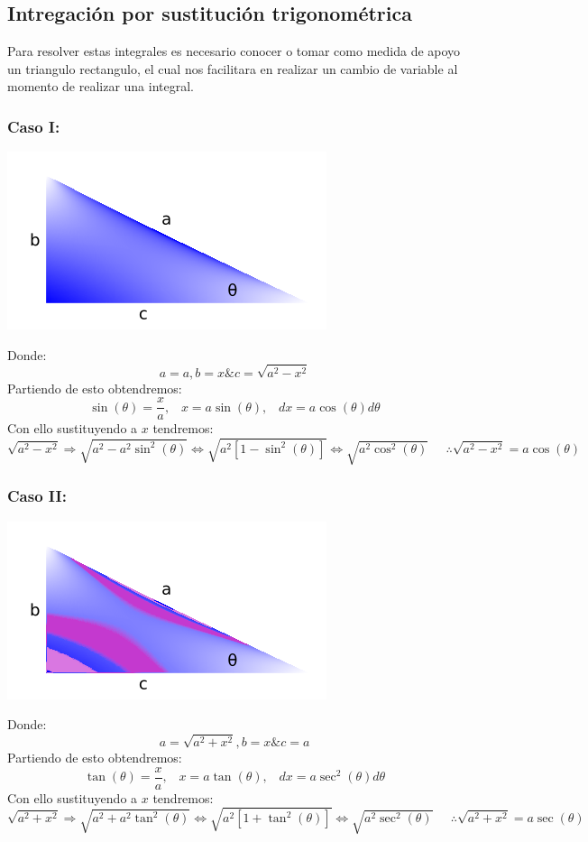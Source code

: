 \documentclass[10pt,executivepaper]{article}
\begin{document}
\subsection{Intregación por sustitución trigonométrica}
Para resolver estas integrales es necesario conocer o tomar como medida de apoyo un triangulo rectangulo, el cual nos facilitara en realizar un cambio de variable al momento de realizar una integral.\\
\subsubsection{Caso I:}
\begin{center}
  \includegraphics[scale=0.5]{imgsAux/triangulo.png}\\
\end{center}
Donde:
\[a=a, b=x \& c=\sqrt{a^{2}-x^{2}}\]
Partiendo de esto obtendremos:
\[\sin(\theta)= \frac{x}{a},\;\;\; x=a\sin(\theta),\;\;\; dx=a\cos(\theta)d\theta\]
Con ello sustituyendo a $x$ tendremos:
\[\sqrt{a^{2}-x^{2}}\Rightarrow \sqrt{a^{2}-a^{2}\sin^{2}(\theta)} \Leftrightarrow \sqrt{a^{2}[1-\sin^{2}(\theta)]} \Leftrightarrow \sqrt{a^{2}\cos^{2}(\theta)}\;\;\;\;\; \therefore \sqrt{a^{2}-x^{2}}=a\cos(\theta)\]
\subsubsection{Caso II:}
\begin{center}
  \includegraphics[scale=0.5]{imgsAux/triangulo1.png}\\
\end{center}
Donde:
\[a=\sqrt{a^{2}+x^{2}}, b=x \& c=a\]
Partiendo de esto obtendremos:
\[\tan(\theta)= \frac{x}{a},\;\;\; x=a\tan(\theta),\;\;\; dx=a\sec^{2}(\theta)d\theta\]
Con ello sustituyendo a $x$ tendremos:
\[\sqrt{a^{2}+x^{2}}\Rightarrow \sqrt{a^{2}+a^{2}\tan^{2}(\theta)} \Leftrightarrow \sqrt{a^{2}[1+\tan^{2}(\theta)]} \Leftrightarrow \sqrt{a^{2}\sec^{2}(\theta)}\;\;\;\;\; \therefore \sqrt{a^{2}+x^{2}}=a\sec(\theta)\]
\clearpage
\end{document}
